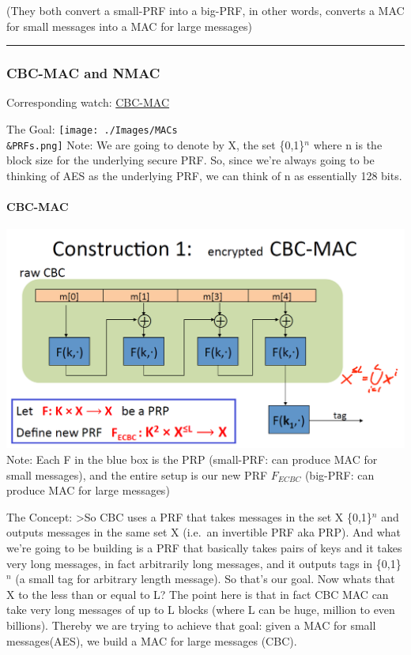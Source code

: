 \documentclass[11pt]{article}
\makeatletter
\def\maxwidth{\ifdim\Gin@nat@width>\linewidth\linewidth
    \else\Gin@nat@width\fi}
\let\Oldincludegraphics\includegraphics
\renewcommand{\includegraphics}[1]{\Oldincludegraphics[width=.8\maxwidth]{#1}}
\makeatother
\begin{document}
(They both convert a small-PRF into a big-PRF, in other words, converts
a MAC for small messages into a MAC for large messages)

\begin{center}\rule{0.5\linewidth}{\linethickness}\end{center}

    \hypertarget{cbc-mac-and-nmac}{%
\subsubsection{CBC-MAC and NMAC}\label{cbc-mac-and-nmac}}

Corresponding watch:
\href{https://www.coursera.org/learn/crypto/lecture/QYT6i/cbc-mac-and-nmac}{CBC-MAC}

The Goal: \texttt{[image: ./Images/MACs\\\&PRFs.png]} Note: We are going
to denote by X, the set \{0,1\}\(^{n}\) where n is the block size for
the underlying secure PRF. So, since we're always going to be thinking
of AES as the underlying PRF, we can think of n as essentially 128 bits.

\hypertarget{cbc-mac}{%
\paragraph{CBC-MAC}\label{cbc-mac}}

\includegraphics{./Images/CBC-MAC.png} Note: Each F in the blue box is
the PRP (small-PRF: can produce MAC for small messages), and the entire
setup is our new PRF \(F_{ECBC}\) (big-PRF: can produce MAC for large
messages)

The Concept: \textgreater{}So CBC uses a PRF that takes messages in the
set X \{0,1\}\(^{n}\) and outputs messages in the same set X (i.e.~an
invertible PRF aka PRP). And what we're going to be building is a PRF
that basically takes pairs of keys and it takes very long messages, in
fact arbitrarily long messages, and it outputs tags in \{0,1\}\(^{n}\)
(a small tag for arbitrary length message). So that's our goal. Now
whats that X to the less than or equal to L? The point here is that in
fact CBC MAC can take very long messages of up to L blocks (where L can
be huge, million to even billions). Thereby we are trying to achieve
that goal: given a MAC for small messages(AES), we build a MAC for large
messages (CBC).
\end{document}
